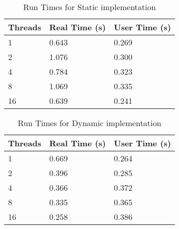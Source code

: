 \documentclass{article}
\begin{document}
\begin{table}[H]
    \centering
    \begin{tabular}{|l|l|l|}
        \hline
        Threads & Real Time (s) & User Time (s) \\ \hline
        1  & 0.643 & 0.269 \\ \hline
        2  & 1.076 & 0.300 \\ \hline
        4  & 0.784 & 0.323 \\ \hline
        8  & 1.069 & 0.335 \\ \hline
        16 & 0.639 & 0.241 \\ \hline
    \end{tabular}
    \caption{Run Times for Static implementation}
    \label{tab:data}
\end{table}
\begin{table}[H]
    \centering
    \begin{tabular}{|l|l|l|}
        \hline
        Threads & Real Time (s) & User Time (s) \\ \hline
        1  & 0.669 & 0.264 \\ \hline
        2  & 0.396 & 0.285 \\ \hline
        4  & 0.366 & 0.372 \\ \hline
        8  & 0.335 & 0.365 \\ \hline
        16 & 0.258 & 0.386 \\ \hline
    \end{tabular}
    \caption{Run Times for Dynamic implementation}
    \label{tab:data}
\end{table}
\end{document}
